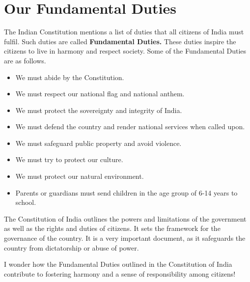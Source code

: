 \section{Our Fundamental Duties}
The Indian Constitution mentions a list of duties that all citizens of India must fulfil. Such duties are called \textbf{Fundamental Duties.} These duties inspire the citizens to live in harmony and respect society. Some of the Fundamental Duties are as follows.
\begin{itemize}
    \item We must abide by the Constitution.
    \item We must respect our national flag and national anthem.
    \vspace{0.4in}
    \item We must protect the sovereignty and integrity of India.
    \item We must defend the country and render national services when called upon.
    \item We must safeguard public property and avoid violence.
    \item We must try to protect our culture.
    \item We must protect our natural environment.
    \item Parents or guardians must send children in the age group of 6-14 years to school.
\end{itemize}
The Constitution of India outlines the powers and limitations of the government as well as the rights and duties of citizens. It sets the framework for the governance of the country. It is a very important document, as it safeguards the country from dictatorship or abuse of power.
\vspace{0.3in}
\par
I wonder how the Fundamental Duties outlined in the Constitution of India contribute to fostering harmony and a sense of responsibility among citizens!
\vspace{2.2in}
